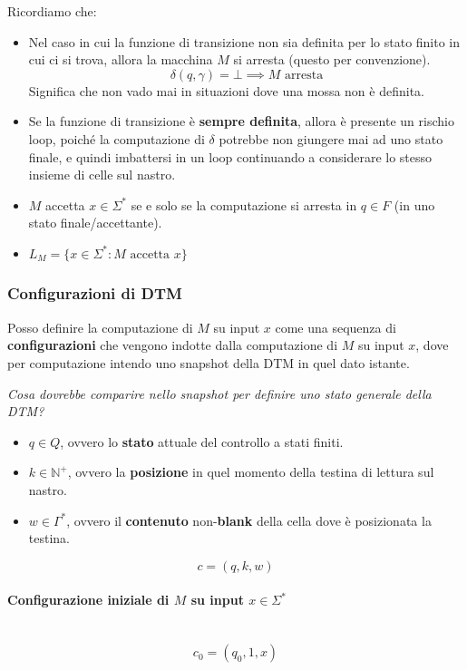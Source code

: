 \documentclass{article}
\begin{document}
Ricordiamo che:
\begin{itemize}
    \item Nel caso in cui la funzione di transizione non sia definita per lo stato
          finito in cui ci si trova, allora la macchina $M$ si arresta (questo per convenzione).
          $$\delta(q,\gamma)=\bot\implies M\text{ arresta}$$
          Significa che non vado mai in situazioni dove una mossa non è definita.

    \item Se la funzione di transizione è \textbf{sempre definita}, allora è presente un
          rischio loop, poiché la computazione di $\delta$ potrebbe non giungere mai ad uno stato finale,
          e quindi imbattersi in un loop continuando a considerare lo stesso insieme di celle sul nastro.

    \item $M$ accetta $x\in\Sigma^*$ se e solo se la computazione si arresta
          in $q\in F$ (in uno stato finale/accettante).

    \item $L_M=\{x\in\Sigma^*:M\text{ accetta }x\}$
\end{itemize}

\subsubsection{Configurazioni di DTM}
Posso definire la computazione di $M$ su input $x$ come una sequenza di \textbf{configurazioni}
che vengono indotte dalla computazione di $M$ su input $x$, dove per computazione intendo
uno snapshot della DTM in quel dato istante.

\textit{Cosa dovrebbe comparire nello snapshot per definire uno stato generale della DTM?}
\begin{itemize}
    \item $q\in Q$, ovvero lo \textbf{stato} attuale del controllo a stati finiti.
    \item $k\in\mathbb{N}^+$, ovvero la \textbf{posizione} in quel momento della testina di lettura sul nastro.
    \item $w\in\Gamma^*$, ovvero il \textbf{contenuto} non-\textbf{blank} della cella dove è posizionata la testina.
\end{itemize}
$$c=(q,k,w)$$
\paragraph{Configurazione iniziale di $M$ su input $x\in\Sigma^*$}\mbox{}\\
$$c_0=(q_0,1,x)$$
\end{document}
